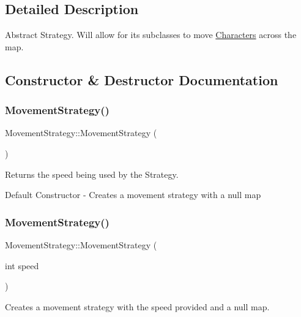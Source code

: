 \subsection{Detailed Description}
Abstract Strategy. Will allow for its subclasses to move \hyperlink{class_characters}{Characters} across the map. 

\subsection{Constructor \& Destructor Documentation}
\hypertarget{class_movement_strategy_a2d5e9218c78466ba67ca7b3f4e51c2d8}{}\label{class_movement_strategy_a2d5e9218c78466ba67ca7b3f4e51c2d8} 
\subsubsection{\texorpdfstring{Movement\+Strategy()}{MovementStrategy()}\hspace{0.1cm}{\footnotesize\ttfamily [1/2]}}
{\footnotesize\ttfamily Movement\+Strategy\+::\+Movement\+Strategy (\begin{DoxyParamCaption}{ }\end{DoxyParamCaption})}



Returns the speed being used by the Strategy. 

Default Constructor -\/ Creates a movement strategy with a null map \hypertarget{class_movement_strategy_af30f05e5af1a565613b355770b35e3cf}{}\label{class_movement_strategy_af30f05e5af1a565613b355770b35e3cf} 
\subsubsection{\texorpdfstring{Movement\+Strategy()}{MovementStrategy()}\hspace{0.1cm}{\footnotesize\ttfamily [2/2]}}
{\footnotesize\ttfamily Movement\+Strategy\+::\+Movement\+Strategy (\begin{DoxyParamCaption}\item[{int}]{speed }\end{DoxyParamCaption})}

Creates a movement strategy with the speed provided and a null map. 

